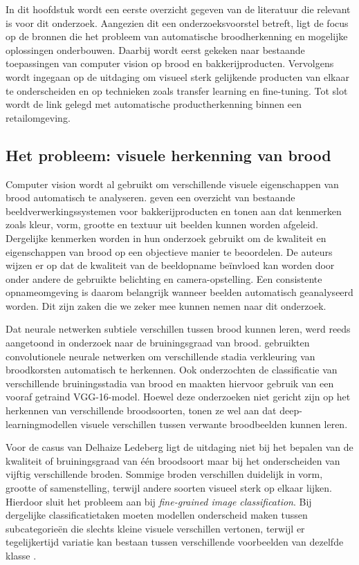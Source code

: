 In dit hoofdstuk wordt een eerste overzicht gegeven van de literatuur die relevant is voor dit onderzoek. Aangezien dit een onderzoeksvoorstel betreft, ligt de focus op de bronnen die het probleem van automatische broodherkenning en mogelijke oplossingen onderbouwen. Daarbij wordt eerst gekeken naar bestaande toepassingen van computer vision op brood en bakkerijproducten. Vervolgens wordt ingegaan op de uitdaging om visueel sterk gelijkende producten van elkaar te onderscheiden en op technieken zoals transfer learning en fine-tuning. Tot slot wordt de link gelegd met automatische productherkenning binnen een retailomgeving.

\subsection{Het probleem: visuele herkenning van brood}

Computer vision wordt al gebruikt om verschillende visuele eigenschappen van brood automatisch te analyseren. \textcite{Olakanmi2023} geven een overzicht van bestaande beeldverwerkingssystemen voor bakkerijproducten en tonen aan dat kenmerken zoals kleur, vorm, grootte en textuur uit beelden kunnen worden afgeleid. Dergelijke kenmerken worden in hun onderzoek gebruikt om de kwaliteit en eigenschappen van brood op een objectieve manier te beoordelen. De auteurs wijzen er op dat de kwaliteit van de beeldopname beïnvloed kan worden door onder andere de gebruikte belichting en camera-op\-stel\-ling. Een consistente opnameomgeving is daarom belangrijk wanneer beelden automatisch geanalyseerd worden. Dit zijn zaken die we zeker mee kunnen nemen naar dit onderzoek.

Dat neurale netwerken subtiele verschillen tussen brood kunnen leren, werd reeds aangetoond in onderzoek naar de bruiningsgraad van brood. \textcite{Cotrim2020} gebruikten convolutionele neurale netwerken om verschillende stadia verkleuring van broodkorsten automatisch te herkennen. Ook \textcite{Tantiphanwadi2022} onderzochten de classificatie van verschillende bruiningsstadia van brood en maakten hiervoor gebruik van een vooraf getraind VGG-16-model. Hoewel deze onderzoeken niet gericht zijn op het herkennen van verschillende broodsoorten, tonen ze wel aan dat deep-learning\-mo\-del\-len visuele verschillen tussen verwante broodbeelden kunnen leren.

Voor de casus van Delhaize Ledeberg ligt de uitdaging niet bij het bepalen van de kwaliteit of bruiningsgraad van één broodsoort maar bij het onderscheiden van vijftig verschillende broden. Sommige broden verschillen duidelijk in vorm, grootte of samenstelling, terwijl andere soorten visueel sterk op elkaar lijken. Hierdoor sluit het probleem aan bij \textit{fine-grained image classification}. Bij dergelijke classificatietaken moeten modellen onderscheid maken tussen subcategorieën die slechts kleine visuele verschillen vertonen, terwijl er tegelijkertijd variatie kan bestaan tussen verschillende voorbeelden van dezelfde klasse \autocite{Wei_2022}.


